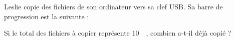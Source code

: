 
\begin{exercice}\label{exosmath-0817}

    Leslie copie des fichiers de son ordinateur vers sa clef USB. Sa barre de progression est la suivante :
\begin{center}
   
\end{center}
Si le total des fichiers à copier représente \SI{10}{\gibi\byte}, combien a-t-il déjà copié ?

\end{exercice}
